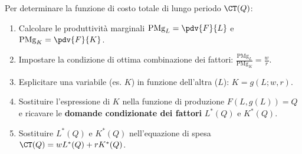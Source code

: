 \begin{metodo}
Per determinare la funzione di costo totale di lungo periodo $\CT(Q)$:
\begin{enumerate}
    \item Calcolare le produttività marginali $\mathrm{PMg}_L = \pdv{F}{L}$ e $\mathrm{PMg}_K = \pdv{F}{K}$.
    \item Impostare la condizione di ottima combinazione dei fattori: $\frac{\mathrm{PMg}_L}{\mathrm{PMg}_K} = \frac{w}{r}$.
    \item Esplicitare una variabile (es. $K$) in funzione dell'altra ($L$): $K = g(L; w, r)$.
    \item Sostituire l'espressione di $K$ nella funzione di produzione $F(L, g(L)) = Q$ e ricavare le \textbf{domande condizionate dei fattori} $L^*(Q)$ e $K^*(Q)$.
    \item Sostituire $L^*(Q)$ e $K^*(Q)$ nell'equazione di spesa $\CT(Q) = w L^*(Q) + r K^*(Q)$.
\end{enumerate}
\end{metodo}

